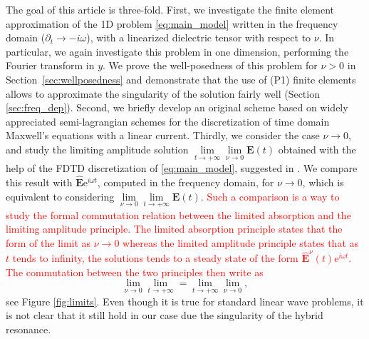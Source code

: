 The goal of this article is three-fold. 
First, we investigate the finite element approximation of the 1D 
problem \eqref{eq:main_model} written in the frequency domain ($\partial_t\rightarrow -i\omega$), with a linearized dielectric tensor with respect to $\nu$.
In particular, we again investigate this problem in one dimension, performing the Fourier transform in $y$.
We prove the well-posedness of this problem for $\nu>0$ in Section~\ref{sec:wellposedness} and 
demonstrate that the use of  (P1) finite elements allows to approximate the singularity 
of the solution fairly well (Section \ref{sec:freq_dep}). 
Second, we briefly develop an original scheme based on widely appreciated semi-lagrangian schemes
for the discretization of time domain Maxwell's equations with a linear current.
Thirdly, we consider the case $\nu\rightarrow 0$, and study the limiting amplitude solution 
$\lim\limits_{t\rightarrow +\infty}\lim\limits_{\nu\rightarrow 0}\mathbf{E}(t)$ obtained with the help of 
the FDTD discretization of \eqref{eq:main_model}, suggested in \cite{stable_yee_plasma_current}. 
We compare this result with 
$\hat{\mathbf{E}}\mathrm{e}^{i\omega t}$, computed in the frequency domain, for $\nu\rightarrow 0$, which is equivalent to considering
$\lim\limits_{\nu\rightarrow 0}\lim\limits_{t\rightarrow+\infty}\mathbf{E}(t)$.
\textcolor{red}{Such a comparison is a way to study the formal commutation relation between the limited absorption and the limiting amplitude principle. The limited absorption principle states that the form of the limit as $\nu \to 0$ whereas the limited amplitude principle states that as $t$ tends to infinity, the solutions tends to a steady state of the form $ \hat{\mathbf{E}}^{\nu}(t)\mathrm{e}^{i\omega t}$. The commutation between the two principles then write as}
$$
\lim\limits_{\nu\rightarrow 0}\lim\limits_{t\rightarrow+\infty}= \lim\limits_{t\rightarrow+\infty}\lim\limits_{\nu\rightarrow 0},
$$
see Figure \ref{fig:limits}. 
Even though it is true for standard linear wave problems, it is not clear that it still hold in our case due the singularity
of the hybrid resonance.
